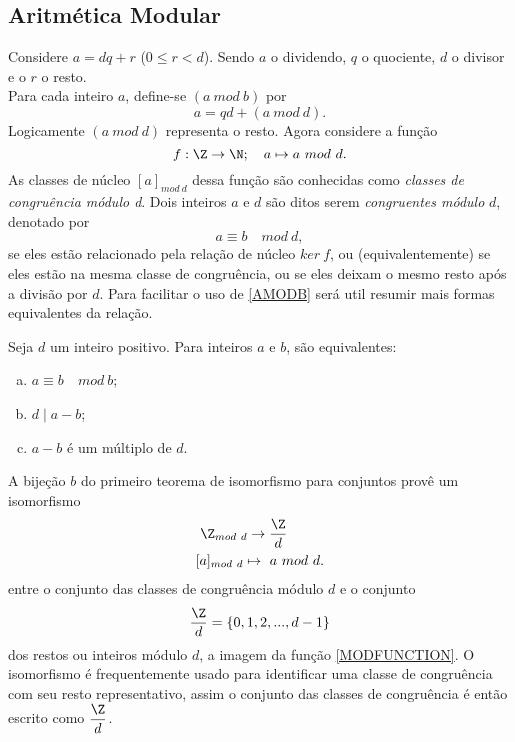    \subsection{Aritmética Modular}
      Considere $a = dq + r$ ($0 \leq r < d$). Sendo $a$ o dividendo, $q$ o quociente, $d$ o divisor e o $r$ o resto.\\
      Para cada inteiro $a$, define-se $(a\ mod\ b)$ por
      \begin{equation}\label{MOD}
         a = qd + (a\ mod\ d).
      \end{equation}
      Logicamente $(a\ mod\ d)$ representa o resto. Agora considere a função
      \begin{equation}\label{MODFUNCTION}
         f: \Z \to \N;\quad a \mapsto a\ mod\ d.
      \end{equation}
      As classes de núcleo $[a]_{mod\ d}$ dessa função são conhecidas como \emph{classes de congruência módulo d}. Dois inteiros $a$ e $d$ são ditos serem \emph{congruentes módulo} $d$, denotado por
      \begin{equation}\label{AMODB}
         a \equiv b\quad mod\ d,
      \end{equation}
      se eles estão relacionado pela relação de núcleo $ker\ f$, ou (equivalentemente) se eles estão na mesma classe de congruência, ou se eles deixam o mesmo resto após a divisão por $d$. Para facilitar o uso de \ref{AMODB} será util resumir mais formas equivalentes da relação.
      \begin{stat}
         Seja $d$ um inteiro positivo. Para inteiros $a$ e $b$, são equivalentes:
         \begin{enumerate}[(a)]
            \item $a\equiv b\quad mod\ b$;
            \item $d \mid a - b$;
            \item $a-b$ é um múltiplo de $d$.
         \end{enumerate}
      \end{stat}
      A bijeção $b$ do primeiro teorema de isomorfismo para conjuntos provê um isomorfismo
      \begin{alignat}{2}
         &\ \Z_{mod\ d} \to \dfrac{\Z}{d}\nonumber\\
         &[a]_{mod\ d} \mapsto\ a\ mod\ d.
         \nonumber
      \end{alignat}
      entre o conjunto das classes de congruência módulo $d$ e o conjunto $$\dfrac{\Z}{d} = \{0,1,2,... , d-1\}$$ dos restos ou inteiros módulo $d$, a imagem da função \ref{MODFUNCTION}. O isomorfismo é frequentemente usado para identificar uma classe de congruência com seu resto representativo, assim o conjunto das classes de congruência é então escrito como $\dfrac{\Z}{d}$.\\
